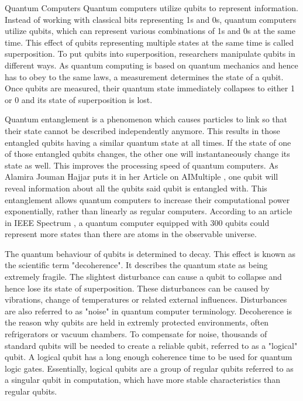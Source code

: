 \documentclass[aps,preprintnumbers,twocolumn]{revtex4}
\begin{document}
\begin{section}{Quantum Computers}
Quantum computers utilize qubits to represent information. 
Instead of working with classical bits representing 1s and 0s, 
quantum computers utilize qubits, which can represent various combinations of 1s and 0s at the same time. 
This effect of qubits representing multiple states at the same time is called superposition. To put qubits into superposition, 
researchers manipulate qubits in different ways. As quantum computing is based on quantum mechanics and hence has to obey to the same laws, 
a measurement determines the state of a qubit. Once qubits are measured, 
their quantum state immediately collapses to either 1 or 0 and its state of superposition is lost.

Quantum entanglement is a phenomenon which causes particles to link so that their state cannot be described independently anymore.
This results in those entangled qubits having a similar quantum state at all times.
If the state of one of those entangled qubits changes,
the other one will instantaneously change its state as well. This improves the processing speed of quantum computers. As Alamira Jouman Hajjar puts it in her Article on AIMultiple \cite{AIMultiple}, one qubit will reveal information about all the qubits said qubit is entangled with.
This entanglement allows quantum computers to increase their computational power exponentially,
rather than linearly as regular computers.
According to an article in IEEE Spectrum \cite{IEEE}, a quantum computer equipped with 300 qubits could represent more states than there are atoms in the observable universe.

The quantum behaviour of qubits is determined to decay.
This effect is known as the scientific term "decoherence".
It describes the quantum state as being extremely fragile.
The slightest disturbance can cause a qubit to collapse and hence lose its state of superposition.
These disturbances can be caused by vibrations, change of temperatures or related external influences.
Disturbances are also referred to as "noise" in quantum computer terminology.
Decoherence is the reason why qubits are held in extremly protected environments, 
often refrigerators or vacuum chambers.
To compensate for noise, 
thousands of standard qubits will be needed to create a reliable qubit, 
referred to as a "logical" qubit. 
A logical qubit has a long enough coherence time to be used for quantum logic gates. 
Essentially, logical qubits are a group of regular qubits referred to as a singular qubit in computation, 
which have more stable characteristics than regular qubits.


\end{section}
\end{document}
